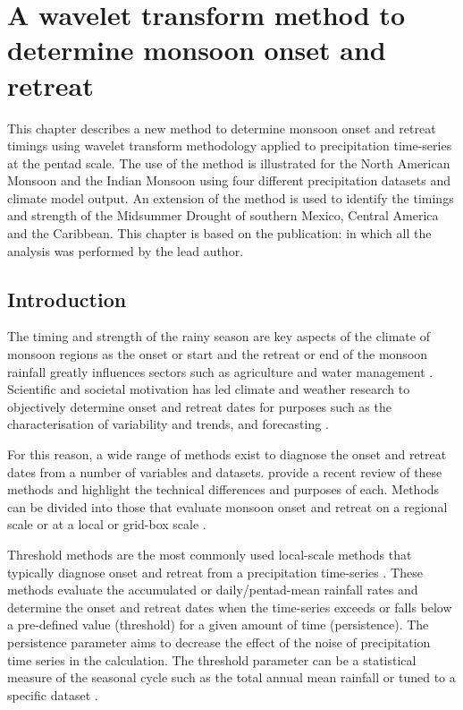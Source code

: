 \chapter{\label{ch:5-wvt}A wavelet transform method to determine monsoon onset and retreat}

This chapter describes a new method to determine monsoon onset and retreat timings using wavelet transform methodology applied to precipitation time-series at the pentad scale. 
The use of the method is illustrated for the North American Monsoon and the Indian Monsoon using four different precipitation datasets and climate model output. 
An extension of the method is used to identify the timings and strength of the Midsummer Drought of southern Mexico, Central America and the Caribbean. 
This chapter is based on the publication: \cite{garciafranco2021} in which all the analysis was performed by the lead author.

\section{Introduction}

The timing and strength of the rainy season are key aspects of the climate of monsoon regions as the onset or start and the retreat or end of the monsoon rainfall greatly influences sectors such as agriculture \citep{sultan2005,Gadgil2006,jain2015,harvey2018} and water management \citep{turner2012,bussman2016}.
Scientific and societal motivation has led climate and weather research to objectively determine  onset and retreat dates for purposes such as the characterisation of variability and trends, and forecasting \citep[e.g.][]{kitoh2006,cook2009,picher,nieto2011,htway2011}. 

For this reason, a wide range  of methods exist to diagnose the onset and retreat dates from a number of variables and datasets.
\cite{bombardi2019} provide a recent review of these methods and highlight the technical differences and purposes of each. Methods can be divided into those that evaluate monsoon onset and retreat on a regional scale \citep[e.g.][]{webster1992,fasullo2003,garcia2013}  or at a local or grid-box scale \citep[e.g.][]{liebmann2001interannual,cook2009}. 

Threshold methods are the most commonly used local-scale methods that typically diagnose onset and retreat from a precipitation time-series \citep{bombardi2019}. 
These methods evaluate the accumulated  \citep{liebmann2001interannual} or daily/pentad-mean rainfall rates \citep{geil2013} and determine the onset and retreat dates when the time-series exceeds or falls below a pre-defined value (threshold) for a given amount of time (persistence). The persistence parameter aims to decrease the effect of the noise of precipitation time series in the calculation. The threshold parameter can be a statistical measure of the seasonal cycle such as the total annual mean rainfall \citep{arias2012}  or tuned to a specific dataset \citep[e.g.][]{geil2013}.

